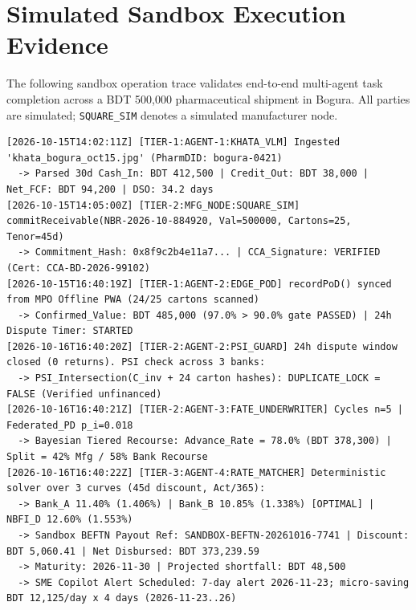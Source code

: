 \documentclass[10pt,a4paper]{article}
\begin{document}
\section{Simulated Sandbox Execution Evidence}
The following sandbox operation trace validates end-to-end multi-agent task completion across a BDT 500,000 pharmaceutical shipment in Bogura. All parties are simulated; \texttt{SQUARE\_SIM} denotes a simulated manufacturer node.

\scriptsize
\begin{verbatim}
[2026-10-15T14:02:11Z] [TIER-1:AGENT-1:KHATA_VLM] Ingested 'khata_bogura_oct15.jpg' (PharmDID: bogura-0421)
  -> Parsed 30d Cash_In: BDT 412,500 | Credit_Out: BDT 38,000 | Net_FCF: BDT 94,200 | DSO: 34.2 days
[2026-10-15T14:05:00Z] [TIER-2:MFG_NODE:SQUARE_SIM] commitReceivable(NBR-2026-10-884920, Val=500000, Cartons=25, Tenor=45d)
  -> Commitment_Hash: 0x8f9c2b4e11a7... | CCA_Signature: VERIFIED (Cert: CCA-BD-2026-99102)
[2026-10-15T16:40:19Z] [TIER-1:AGENT-2:EDGE_POD] recordPoD() synced from MPO Offline PWA (24/25 cartons scanned)
  -> Confirmed_Value: BDT 485,000 (97.0% > 90.0% gate PASSED) | 24h Dispute Timer: STARTED
[2026-10-16T16:40:20Z] [TIER-2:AGENT-2:PSI_GUARD] 24h dispute window closed (0 returns). PSI check across 3 banks:
  -> PSI_Intersection(C_inv + 24 carton hashes): DUPLICATE_LOCK = FALSE (Verified unfinanced)
[2026-10-16T16:40:21Z] [TIER-2:AGENT-3:FATE_UNDERWRITER] Cycles n=5 | Federated_PD p_i=0.018
  -> Bayesian Tiered Recourse: Advance_Rate = 78.0% (BDT 378,300) | Split = 42% Mfg / 58% Bank Recourse
[2026-10-16T16:40:22Z] [TIER-3:AGENT-4:RATE_MATCHER] Deterministic solver over 3 curves (45d discount, Act/365):
  -> Bank_A 11.40% (1.406%) | Bank_B 10.85% (1.338%) [OPTIMAL] | NBFI_D 12.60% (1.553%)
  -> Sandbox BEFTN Payout Ref: SANDBOX-BEFTN-20261016-7741 | Discount: BDT 5,060.41 | Net Disbursed: BDT 373,239.59
  -> Maturity: 2026-11-30 | Projected shortfall: BDT 48,500
  -> SME Copilot Alert Scheduled: 7-day alert 2026-11-23; micro-saving BDT 12,125/day x 4 days (2026-11-23..26)
\end{verbatim}
\normalsize
\end{document}
